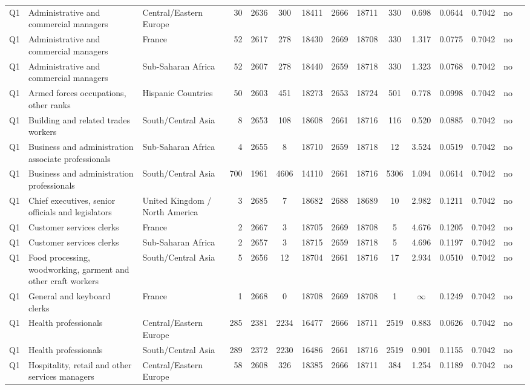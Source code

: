 \begin{longtable}{lllrcccccccccll}
Q1 & Administrative and commercial managers & Central/Eastern Europe & 30 & 2636 & 300 & 18411 & 2666 & 18711 & 330 & 0.698 & 0.0644 & 0.7042 & no \\
Q1 & Administrative and commercial managers & France & 52 & 2617 & 278 & 18430 & 2669 & 18708 & 330 & 1.317 & 0.0775 & 0.7042 & no \\
Q1 & Administrative and commercial managers & Sub-Saharan Africa & 52 & 2607 & 278 & 18440 & 2659 & 18718 & 330 & 1.323 & 0.0768 & 0.7042 & no \\
Q1 & Armed forces occupations, other ranks & Hispanic Countries & 50 & 2603 & 451 & 18273 & 2653 & 18724 & 501 & 0.778 & 0.0998 & 0.7042 & no \\
Q1 & Building and related trades workers & South/Central Asia & 8 & 2653 & 108 & 18608 & 2661 & 18716 & 116 & 0.520 & 0.0885 & 0.7042 & no \\
Q1 & Business and administration associate professionals & Sub-Saharan Africa & 4 & 2655 & 8 & 18710 & 2659 & 18718 & 12 & 3.524 & 0.0519 & 0.7042 & no \\
Q1 & Business and administration professionals & South/Central Asia & 700 & 1961 & 4606 & 14110 & 2661 & 18716 & 5306 & 1.094 & 0.0614 & 0.7042 & no \\
Q1 & Chief executives, senior officials and legislators & United Kingdom / North America & 3 & 2685 & 7 & 18682 & 2688 & 18689 & 10 & 2.982 & 0.1211 & 0.7042 & no \\
Q1 & Customer services clerks & France & 2 & 2667 & 3 & 18705 & 2669 & 18708 & 5 & 4.676 & 0.1205 & 0.7042 & no \\
Q1 & Customer services clerks & Sub-Saharan Africa & 2 & 2657 & 3 & 18715 & 2659 & 18718 & 5 & 4.696 & 0.1197 & 0.7042 & no \\
Q1 & Food processing, woodworking, garment and other craft workers & South/Central Asia & 5 & 2656 & 12 & 18704 & 2661 & 18716 & 17 & 2.934 & 0.0510 & 0.7042 & no \\
Q1 & General and keyboard clerks & France & 1 & 2668 & 0 & 18708 & 2669 & 18708 & 1 & $\infty$ & 0.1249 & 0.7042 & no \\
Q1 & Health professionals & Central/Eastern Europe & 285 & 2381 & 2234 & 16477 & 2666 & 18711 & 2519 & 0.883 & 0.0626 & 0.7042 & no \\
Q1 & Health professionals & South/Central Asia & 289 & 2372 & 2230 & 16486 & 2661 & 18716 & 2519 & 0.901 & 0.1155 & 0.7042 & no \\
Q1 & Hospitality, retail and other services managers & Central/Eastern Europe & 58 & 2608 & 326 & 18385 & 2666 & 18711 & 384 & 1.254 & 0.1189 & 0.7042 & no \\

\end{longtable}
